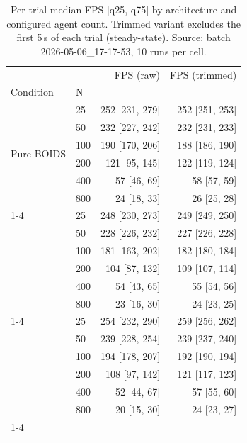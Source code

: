 \begin{table}[htbp]
  \centering
  \caption{Per-trial median FPS [q25, q75] by architecture and configured agent count. Trimmed variant excludes the first 5\,s of each trial (steady-state). Source: batch 2026-05-06_17-17-53, 10 runs per cell.}
  \label{tab:fps-by-architecture}
\begin{tabular}{llrr}
\toprule
 &  & FPS (raw) & FPS (trimmed) \\
Condition & N &  &  \\
\midrule
\multirow[t]{6}{*}{Pure BOIDS} & 25 & 252 [231, 279] & 252 [251, 253] \\
 & 50 & 232 [227, 242] & 232 [231, 233] \\
 & 100 & 190 [170, 206] & 188 [186, 190] \\
 & 200 & 121 [95, 145] & 122 [119, 124] \\
 & 400 & 57 [46, 69] & 58 [57, 59] \\
 & 800 & 24 [18, 33] & 26 [25, 28] \\
\cline{1-4}
\multirow[t]{6}{*}{BOIDS + GOAP Leader} & 25 & 248 [230, 273] & 249 [249, 250] \\
 & 50 & 228 [226, 232] & 227 [226, 228] \\
 & 100 & 181 [163, 202] & 182 [180, 184] \\
 & 200 & 104 [87, 132] & 109 [107, 114] \\
 & 400 & 54 [43, 65] & 55 [54, 56] \\
 & 800 & 23 [16, 30] & 24 [23, 25] \\
\cline{1-4}
\multirow[t]{6}{*}{GOAP + BOIDS Movement} & 25 & 254 [232, 290] & 259 [256, 262] \\
 & 50 & 239 [228, 254] & 239 [237, 240] \\
 & 100 & 194 [178, 207] & 192 [190, 194] \\
 & 200 & 108 [97, 142] & 121 [117, 123] \\
 & 400 & 52 [44, 67] & 57 [55, 60] \\
 & 800 & 20 [15, 30] & 24 [23, 27] \\
\cline{1-4}
\bottomrule
\end{tabular}
\end{table}
